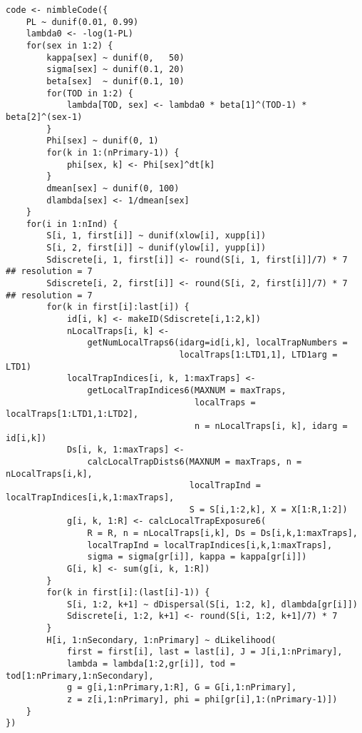 \begin{singlespace}
\begin{small}
\begin{verbatim}
code <- nimbleCode({
    PL ~ dunif(0.01, 0.99)
    lambda0 <- -log(1-PL)
    for(sex in 1:2) {
        kappa[sex] ~ dunif(0,   50)
        sigma[sex] ~ dunif(0.1, 20)
        beta[sex]  ~ dunif(0.1, 10)
        for(TOD in 1:2) {
            lambda[TOD, sex] <- lambda0 * beta[1]^(TOD-1) * beta[2]^(sex-1)
        }
        Phi[sex] ~ dunif(0, 1)
        for(k in 1:(nPrimary-1)) {
            phi[sex, k] <- Phi[sex]^dt[k]
        }
        dmean[sex] ~ dunif(0, 100)
        dlambda[sex] <- 1/dmean[sex]
    }
    for(i in 1:nInd) {
        S[i, 1, first[i]] ~ dunif(xlow[i], xupp[i])
        S[i, 2, first[i]] ~ dunif(ylow[i], yupp[i])
        Sdiscrete[i, 1, first[i]] <- round(S[i, 1, first[i]]/7) * 7   ## resolution = 7
        Sdiscrete[i, 2, first[i]] <- round(S[i, 2, first[i]]/7) * 7   ## resolution = 7
        for(k in first[i]:last[i]) {
            id[i, k] <- makeID(Sdiscrete[i,1:2,k])
            nLocalTraps[i, k] <- 
                getNumLocalTraps6(idarg=id[i,k], localTrapNumbers =
                                  localTraps[1:LTD1,1], LTD1arg = LTD1)
            localTrapIndices[i, k, 1:maxTraps] <- 
                getLocalTrapIndices6(MAXNUM = maxTraps, 
                                     localTraps = localTraps[1:LTD1,1:LTD2], 
                                     n = nLocalTraps[i, k], idarg = id[i,k])
            Ds[i, k, 1:maxTraps] <- 
                calcLocalTrapDists6(MAXNUM = maxTraps, n = nLocalTraps[i,k], 
                                    localTrapInd = localTrapIndices[i,k,1:maxTraps],
                                    S = S[i,1:2,k], X = X[1:R,1:2])
            g[i, k, 1:R] <- calcLocalTrapExposure6(
                R = R, n = nLocalTraps[i,k], Ds = Ds[i,k,1:maxTraps], 
                localTrapInd = localTrapIndices[i,k,1:maxTraps], 
                sigma = sigma[gr[i]], kappa = kappa[gr[i]])
            G[i, k] <- sum(g[i, k, 1:R])
        }
        for(k in first[i]:(last[i]-1)) {
            S[i, 1:2, k+1] ~ dDispersal(S[i, 1:2, k], dlambda[gr[i]])
            Sdiscrete[i, 1:2, k+1] <- round(S[i, 1:2, k+1]/7) * 7
        }
        H[i, 1:nSecondary, 1:nPrimary] ~ dLikelihood(
            first = first[i], last = last[i], J = J[i,1:nPrimary],
            lambda = lambda[1:2,gr[i]], tod = tod[1:nPrimary,1:nSecondary],
            g = g[i,1:nPrimary,1:R], G = G[i,1:nPrimary],
            z = z[i,1:nPrimary], phi = phi[gr[i],1:(nPrimary-1)])
    }
})
\end{verbatim}
\end{small}
\end{singlespace}




